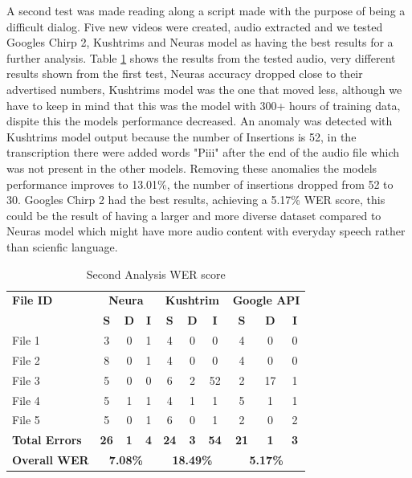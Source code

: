 \documentclass[12pt]{article}
\begin{document}
A second test was made reading along a script made with the purpose of being a difficult dialog. Five new videos were created, audio extracted and we tested Googles Chirp 2, Kushtrims and Neuras model as having the best results for a further analysis. Table \ref{tab:wer_hard} shows the results from the tested audio, very different results shown from the first test, Neuras accuracy dropped close to their advertised numbers, Kushtrims model was the one that moved less, although we have to keep in mind that this was the model with 300+ hours of training data, dispite this the models performance decreased. An anomaly was detected with Kushtrims model output because the number of Insertions is 52, in the transcription there were added words "Piii" after the end of the audio file which was not present in the other models. Removing these anomalies the models performance improves to 13.01\%, the number of insertions dropped from 52 to 30. Googles Chirp 2 had the best results, achieving a 5.17\% WER score, this could be the result of having a larger and more diverse dataset compared to Neuras model which might have more audio content with everyday speech rather than scienfic language.
\begin{table}[h!]
\centering
\caption{Second Analysis WER score}
\label{tab:wer_hard}
\begin{tabular}{lccc|ccc|ccc}
\toprule
\textbf{File ID} & \multicolumn{3}{c}{\textbf{Neura}} & \multicolumn{3}{c}{\textbf{Kushtrim}} & \multicolumn{3}{c}{\textbf{Google API}} \\
\cmidrule(lr){2-4} \cmidrule(lr){5-7} \cmidrule(lr){8-10}
 & \textbf{S} & \textbf{D} & \textbf{I} & \textbf{S} & \textbf{D} & \textbf{I} & \textbf{S} & \textbf{D} & \textbf{I} \\
\midrule
File 1 & 3 & 0 & 1 & 4 & 0 & 0 & 4 & 0 & 0 \\
File 2 & 8 & 0 & 1 & 4 & 0 & 0 & 4 & 0 & 0 \\
File 3 & 5 & 0 & 0 & 6 & 2 & 52 & 2 & 17 & 1 \\
File 4 & 5 & 1 & 1 & 4 & 1 & 1 & 5 & 1 & 1 \\
File 5 & 5 & 0 & 1 & 6 & 0 & 1 & 2 & 0 & 2 \\
\midrule
\textbf{Total Errors} & \textbf{26} & \textbf{1} & \textbf{4} & \textbf{24} & \textbf{3} & \textbf{54} & \textbf{21} & \textbf{1} & \textbf{3} \\
\textbf{Overall WER} & \multicolumn{3}{c}{\textbf{7.08\%}} & \multicolumn{3}{c}{\textbf{18.49\%}} & \multicolumn{3}{c}{\textbf{5.17\%}} \\
\bottomrule
\end{tabular}
\end{table}
\end{document}
